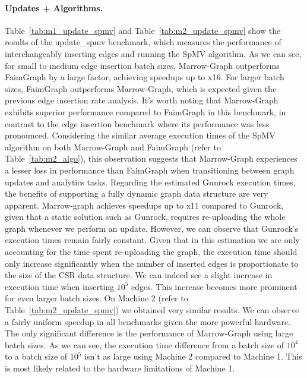\paragraph{\textbf{Updates + Algorithms}.} Table~\ref{tab:m1_update_spmv} and Table~\ref{tab:m2_update_spmv} show the results of the update\_spmv benchmark, which measures the performance of interchangeably inserting edges and running the \gls{SpMV} algorithm. As we can see, for small to medium edge insertion batch sizes, Marrow-Graph outperforms FaimGraph by a large factor, achieving speedups up to x16. For larger batch sizes, FaimGraph outperforms Marrow-Graph, which is expected given the previous edge insertion rate analysis. It's worth noting that Marrow-Graph exhibits superior performance compared to FaimGraph in this benchmark, in contrast to the edge insertion benchmark where its performance was less pronounced. Considering the similar average execution times of the \gls{SpMV} algorithm on both Marrow-Graph and FaimGraph (refer to Table~\ref{tab:m2_algo}), this observation suggests that Marrow-Graph experiences a lesser loss in performance than FaimGraph when transitioning between graph updates and analytics tasks. Regarding the estimated Gunrock execution times, the benefits of supporting a fully dynamic graph data structure are very apparent. Marrow-graph achieves speedups up to x11 compared to Gunrock, given that a static solution such as Gunrock, requires re-uploading the whole graph whenever we perform an update. However, we can observe that Gunrock's execution times remain fairly constant. Given that in this estimation we are only accounting for the time spent re-uploading the graph, the execution time should only increase significantly when the number of inserted edges is proportionate to the size of the \gls{CSR} data structure. We can indeed see a slight increase in execution time when inserting $10^5$ edges. This increase becomes more prominent for even larger batch sizes. On Machine 2 (refer to Table~\ref{tab:m2_update_spmv}) we obtained very similar results. We can observe a fairly uniform speedup in all benchmarks given the more powerful hardware. The only significant difference is the performance of Marrow-Graph using large batch sizes. As we can see, the execution time difference from a batch size of $10^4$ to a batch size of $10^5$ isn't as large using Machine 2 compared to Machine 1. This is most likely related to the hardware limitations of Machine 1.



